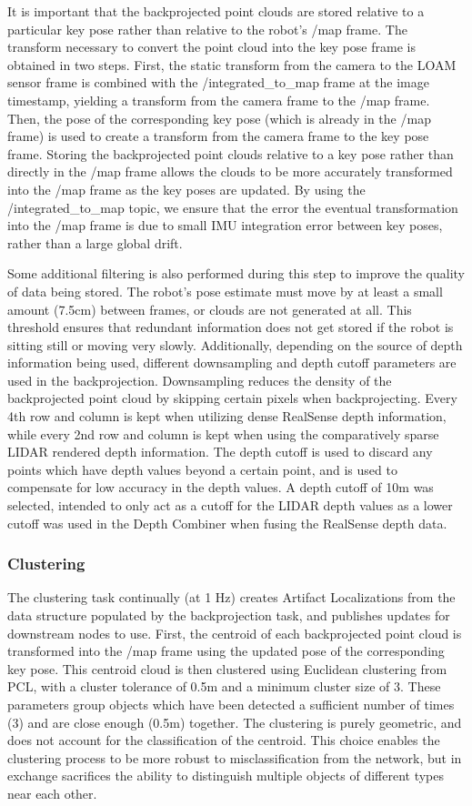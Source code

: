 It is important that the backprojected point clouds are stored relative to a particular key pose rather than relative to the robot's /map frame. The transform necessary to convert the point cloud into the key pose frame is obtained in two steps. First, the static transform from the camera to the LOAM sensor frame is combined with the /integrated\_to\_map frame at the image timestamp, yielding a transform from the camera frame to the /map frame. Then, the pose of the corresponding key pose (which is already in the /map frame) is used to create a transform from the camera frame to the key pose frame. Storing the backprojected point clouds relative to a key pose rather than directly in the /map frame allows the clouds to be more accurately transformed into the /map frame as the key poses are updated. By using the /integrated\_to\_map topic, we ensure that the error the eventual transformation into the /map frame is due to small IMU integration error between key poses, rather than a large global drift.
	
Some additional filtering is also performed during this step to improve the quality of data being stored. The robot's pose estimate must move by at least a small amount (7.5cm) between frames, or clouds are not generated at all. This threshold ensures that redundant information does not get stored if the robot is sitting still or moving very slowly. Additionally, depending on the source of depth information being used, different downsampling and depth cutoff parameters are used in the backprojection. Downsampling reduces the density of the backprojected point cloud by skipping certain pixels when backprojecting. Every 4th row and column is kept when utilizing dense RealSense depth information, while every 2nd row and column is kept when using the comparatively sparse LIDAR rendered depth information. The depth cutoff is used to discard any points which have depth values beyond a certain point, and is used to compensate for low accuracy in the depth values. A depth cutoff of 10m was selected, intended to only act as a cutoff for the LIDAR depth values as a lower cutoff was used in the Depth Combiner when fusing the RealSense depth data.
	
\subsubsection{Clustering}
The clustering task continually (at 1 Hz) creates Artifact Localizations from the data structure populated by the backprojection task, and publishes updates for downstream nodes to use. First, the centroid of each backprojected point cloud is transformed into the /map frame using the updated pose of the corresponding key pose. This centroid cloud is then clustered using Euclidean clustering from PCL, with a cluster tolerance of 0.5m and a minimum cluster size of 3. These parameters group objects which have been detected a sufficient number of times (3) and are close enough (0.5m) together. The clustering is purely geometric, and does not account for the classification of the centroid. This choice enables the clustering process to be more robust to misclassification from the network, but in exchange sacrifices the ability to distinguish multiple objects of different types near each other.
	
